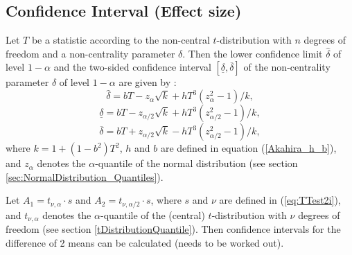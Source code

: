 \subsection{Confidence Interval (Effect size)}
Let $T$ be a statistic according to the non-central $t$-distribution
with $n$ degrees of freedom and a non-centrality parameter $\delta$. Then
the lower confidence limit $\widehat{\delta}$ of level $1-\alpha$ and the two-sided confidence interval $[ \underline{\delta},\overline{\delta}]$ of the
non-centrality parameter $\delta$ of level $1-\alpha$ are given by \cite{akahira_1995}:
\begin{equation}
	\widehat{\delta} = bT - z_\alpha \sqrt{k} +  h T^3 (z_\alpha^2 - 1)/k,
\end{equation} 
\begin{equation}
	\underline{\delta} = bT - z_{\alpha/2} \sqrt{k} +  h T^3 (z_{\alpha/2}^2 - 1)/k,
\end{equation} 
\begin{equation}
	\overline{\delta} = bT + z_{\alpha/2} \sqrt{k} -  h T^3 (z_{\alpha/2}^2 - 1)/k,
\end{equation} 
where $k=1+(1-b^2)T^2$, $h$ and $b$ are defined in equation (\ref{Akahira_h_b}), and $z_\alpha$ denotes the $\alpha$-quantile of the normal distribution (see section \ref{sec:NormalDistribution_Quantiles}).


Let $A_1=t_{\nu,\alpha} \cdot s$ and $A_2=t_{\nu,\alpha/2} \cdot s$, where $s$ and $\nu$ are defined in (\ref{eq:TTest2i}), and $t_{\nu,\alpha}$ denotes the $\alpha$-quantile of the (central) $t$-distribution with $\nu$ degrees of freedom (see section \ref{tDistributionQuantile}). Then confidence intervals for the difference of 2 means can be calculated (needs to be worked out).


%
%


